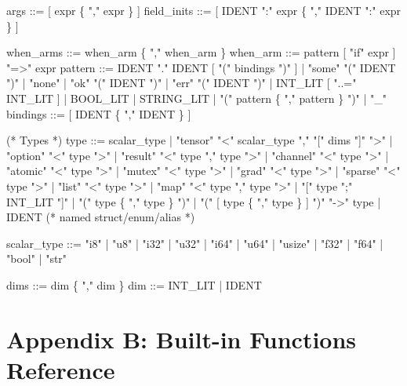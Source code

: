 \documentclass[
  english,
]{book}
\newenvironment{Shaded}{\begin{snugshade}}{\end{snugshade}}
\newcommand{\NormalTok}[1]{\textcolor[rgb]{0.83,0.83,0.83}{#1}}
\begin{document}
\begin{Shaded}
\begin{Highlighting}[]
\NormalTok{args        ::= [ expr \{ "," expr \} ]}
\NormalTok{field\_inits ::= [ IDENT ":" expr \{ "," IDENT ":" expr \} ]}

\NormalTok{when\_arms   ::= when\_arm \{ "," when\_arm \}}
\NormalTok{when\_arm    ::= pattern [ "if" expr ] "=\textgreater{}" expr}
\NormalTok{pattern     ::= IDENT "." IDENT [ "(" bindings ")" ]}
\NormalTok{              | "some" "(" IDENT ")"}
\NormalTok{              | "none"}
\NormalTok{              | "ok" "(" IDENT ")"}
\NormalTok{              | "err" "(" IDENT ")"}
\NormalTok{              | INT\_LIT [ "..=" INT\_LIT ]}
\NormalTok{              | BOOL\_LIT}
\NormalTok{              | STRING\_LIT}
\NormalTok{              | "(" pattern \{ "," pattern \} ")"}
\NormalTok{              | "\_"}
\NormalTok{bindings    ::= [ IDENT \{ "," IDENT \} ]}

\NormalTok{(* Types *)}
\NormalTok{type        ::= scalar\_type}
\NormalTok{              | "tensor" "\textless{}" scalar\_type "," "[" dims "]" "\textgreater{}"}
\NormalTok{              | "option" "\textless{}" type "\textgreater{}"}
\NormalTok{              | "result" "\textless{}" type "," type "\textgreater{}"}
\NormalTok{              | "channel" "\textless{}" type "\textgreater{}"}
\NormalTok{              | "atomic" "\textless{}" type "\textgreater{}"}
\NormalTok{              | "mutex" "\textless{}" type "\textgreater{}"}
\NormalTok{              | "grad" "\textless{}" type "\textgreater{}"}
\NormalTok{              | "sparse" "\textless{}" type "\textgreater{}"}
\NormalTok{              | "list" "\textless{}" type "\textgreater{}"}
\NormalTok{              | "map" "\textless{}" type "," type "\textgreater{}"}
\NormalTok{              | "[" type ";" INT\_LIT "]"}
\NormalTok{              | "(" type \{ "," type \} ")"}
\NormalTok{              | "(" [ type \{ "," type \} ] ")" "{-}\textgreater{}" type}
\NormalTok{              | IDENT  (* named struct/enum/alias *)}

\NormalTok{scalar\_type ::= "i8" | "u8" | "i32" | "u32" | "i64" | "u64" | "usize"}
\NormalTok{              | "f32" | "f64" | "bool" | "str"}

\NormalTok{dims        ::= dim \{ "," dim \}}
\NormalTok{dim         ::= INT\_LIT | IDENT}
\end{Highlighting}
\end{Shaded}

\section{Appendix B: Built-in Functions
Reference}\label{appendix-b-built-in-functions-reference}
\end{document}
